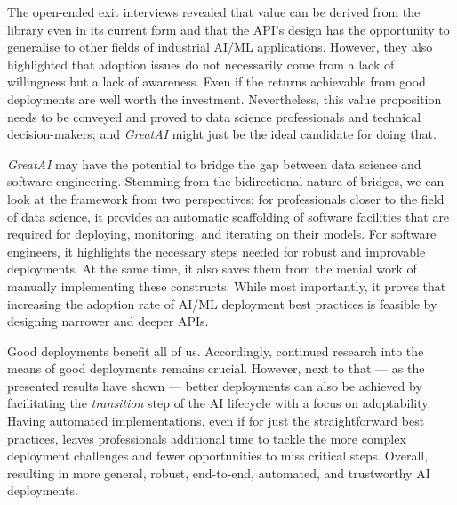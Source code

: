 The open-ended exit interviews revealed that value can be derived from the library even in its current form and that the API's design has the opportunity to generalise to other fields of industrial AI/ML applications. However, they also highlighted that adoption issues do not necessarily come from a lack of willingness but a lack of awareness. Even if the returns achievable from good deployments are well worth the investment. Nevertheless, this value proposition needs to be conveyed and proved to data science professionals and technical decision-makers; and \textit{GreatAI} might just be the ideal candidate for doing that.

\textit{GreatAI} may have the potential to bridge the gap between data science and software engineering. Stemming from the bidirectional nature of bridges, we can look at the framework from two perspectives: for professionals closer to the field of data science, it provides an automatic scaffolding of software facilities that are required for deploying, monitoring, and iterating on their models. For software engineers, it highlights the necessary steps needed for robust and improvable deployments. At the same time, it also saves them from the menial work of manually implementing these constructs. While most importantly, it proves that increasing the adoption rate of AI/ML deployment best practices is feasible by designing narrower and deeper APIs.

Good deployments benefit all of us. Accordingly, continued research into the means of good deployments remains crucial. However, next to that --- as the presented results have shown --- better deployments can also be achieved by facilitating the \textit{transition} step of the AI lifecycle with a focus on adoptability. Having automated implementations, even if for just the straightforward best practices, leaves professionals additional time to tackle the more complex deployment challenges and fewer opportunities to miss critical steps. Overall, resulting in more general, robust, end-to-end, automated, and trustworthy AI deployments.
